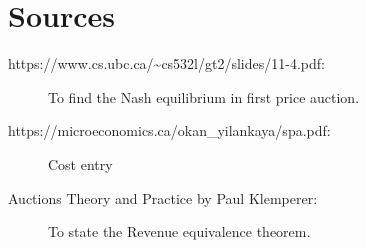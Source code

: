 \documentclass[12pt]{article}
\begin{document}
\section*{Sources}
\begin{description}
\item[https://www.cs.ubc.ca/\textasciitilde cs532l/gt2/slides/11-4.pdf:] To find the Nash equilibrium in first price auction.
\item[https://microeconomics.ca/okan\_yilankaya/spa.pdf: ] Cost entry
\item[Auctions Theory and Practice by Paul Klemperer:] To state the Revenue equivalence theorem.
\end{description}
\end{document}
